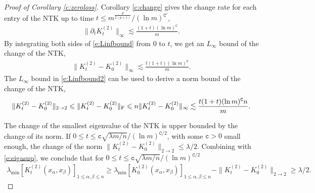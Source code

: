 \documentclass{article}
\numberwithin{equation}{section}
\newcommand{\fc}{{\mathtt c}}
\newcommand{\fC}{{\mathtt C}}
\newcommand{\al}{\alpha}
\newcommand{\la}{\lambda}
\renewcommand{\leq}{\leqslant}
\renewcommand{\geq}{\geqslant}
\newcommand{\cob}{\color{darkblue}}
\newcommand{\nc}{\normalcolor}
\newcommand{\del}{\partial}
\newcommand{\1}{\mathds{1}}
\theoremstyle{plain} %
\begin{document}
\begin{proof}[Proof of Corollary \ref{c:zeroloss}]
Corollary \ref{c:change} gives the change rate for each entry of the NTK up to time $t\leq m^{ \frac{p}{2(p+1)}}/(\ln m)^{\fC'}$,
\begin{align}\label{e:Linfbound}
\|\del_t K_t^{(2)}\|_\infty\lesssim \frac{(1+t)(\ln m)^\fC}{m}.
\end{align}
By integrating both sides of \eqref{e:Linfbound} from $0$ to $t$, we get an $L_\infty$ bound of the change of the NTK,
\begin{align}\label{e:Linfbound2}
\|K_t^{(2)}-K_0^{(2)}\|_{\infty}
\lesssim \frac{t(1+t)(\ln m)^\fC}{m}.
\end{align}
The $L_\infty$ bound in \eqref{e:Linfbound2} can be used to derive a norm bound of the change of the NTK,
\begin{align*}
\|K_t^{(2)}-K_0^{(2)}\|_{2\rightarrow 2}
\leq \|K_t^{(2)}-K_0^{(2)}\|_{\rm F}
\leq n \|K_t^{(2)}-K_0^{(2)}\|_{\infty}
\lesssim \frac{t(1+t)(\ln m)^\fC n}{m}.
\end{align*}


%
%
%


The change of the smallest eigenvalue of the NTK is upper bounded by the change of its norm. If $0\leq t\leq \fc\sqrt{\la m/n}/(\ln m)^{\fC/2}$, with some $\fc>0$ small enough, the change of the norm $\|K_t^{(2)}-K_0^{(2)}\|_{2\rightarrow 2}\leq \la/2$. Combining with
\eqref{e:eigasup}, we conclude that for $0\leq t\leq \fc\sqrt{\la m/n}/(\ln m)^{\fC/2}$
\begin{align}\label{e:eigminbound}
\la_{\min} \left[K_t^{(2)}(x_\al, x_\beta)\right]_{1\leq \al, \beta\leq n}
\geq \la_{\min} \left[K_0^{(2)}(x_\al, x_\beta)\right]_{1\leq \al, \beta\leq n}
-\|K_t^{(2)}-K_0^{(2)}\|_{2\rightarrow 2}\geq \la/2.
\end{align}


\end{proof}
\end{document}
